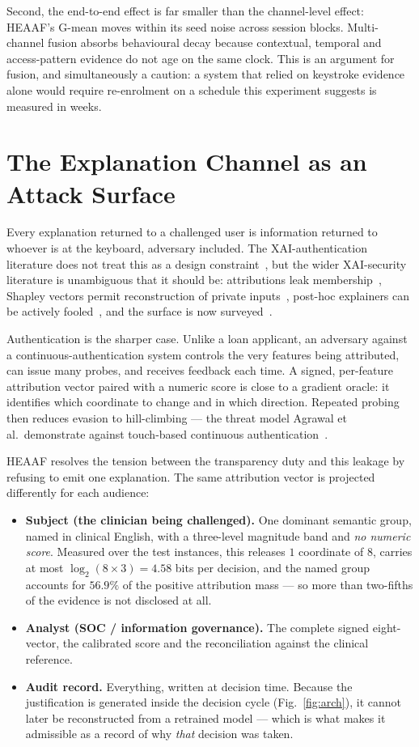 \documentclass[conference]{IEEEtran}
\begin{document}
Second, the end-to-end effect is far smaller than the channel-level effect:
HEAAF's G-mean moves within its seed noise across session blocks. Multi-channel
fusion absorbs behavioural decay because contextual, temporal and
access-pattern evidence do not age on the same clock. This is an argument for
fusion, and simultaneously a caution: a system that relied on keystroke
evidence alone would require re-enrolment on a schedule this experiment
suggests is measured in weeks.
\section{The Explanation Channel as an Attack Surface}
\label{sec:security}

Every explanation returned to a challenged user is information returned to
whoever is at the keyboard, adversary included. The XAI-authentication
literature does not treat this as a design constraint~\cite{raouf2024,nizam2026},
but the wider XAI-security literature is unambiguous that it should be:
attributions leak membership~\cite{shokri2021}, Shapley vectors permit
reconstruction of private inputs~\cite{luo2022}, post-hoc explainers can be
actively fooled~\cite{slack2020}, and the surface is now
surveyed~\cite{baniecki2024,nguyen2024,quan2022}.

Authentication is the sharper case. Unlike a loan applicant, an adversary
against a continuous-authentication system controls the very features being
attributed, can issue many probes, and receives feedback each time. A signed,
per-feature attribution vector paired with a numeric score is close to a
gradient oracle: it identifies which coordinate to change and in which
direction. Repeated probing then reduces evasion to hill-climbing --- the
threat model Agrawal et al.\ demonstrate against touch-based continuous
authentication~\cite{agrawal2021}.

HEAAF resolves the tension between the transparency duty and this leakage by
refusing to emit one explanation. The same attribution vector is projected
differently for each audience:

\begin{itemize}
\item \textbf{Subject (the clinician being challenged).} One dominant semantic
group, named in clinical English, with a three-level magnitude band and
\emph{no numeric score}. Measured over the test instances, this releases $1$
coordinate of $8$, carries at most $\log_2(8\times3)=4.58$ bits per decision,
and the named group accounts for $56.9\%$ of the positive attribution mass ---
so more than two-fifths of the evidence is not disclosed at all.
\item \textbf{Analyst (SOC / information governance).} The complete signed
eight-vector, the calibrated score and the reconciliation against the clinical
reference.
\item \textbf{Audit record.} Everything, written at decision time. Because the
justification is generated inside the decision cycle
(Fig.~\ref{fig:arch}), it cannot later be reconstructed from a retrained
model --- which is what makes it admissible as a record of why \emph{that}
decision was taken.
\end{itemize}
\end{document}
